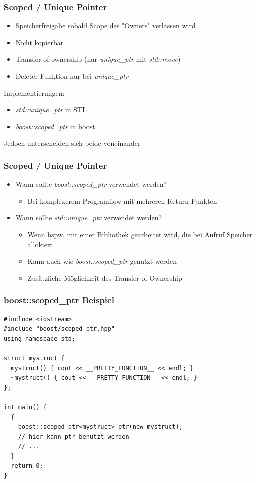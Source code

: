 \documentclass{beamer}
\begin{document}
\begin{frame}[fragile]
 \frametitle{Scoped / Unique Pointer}
 \begin{itemize}
  \item Speicherfreigabe sobald Scope des "Owners" verlassen wird
  \item Nicht kopierbar
  \item Transfer of ownership \tiny (nur \textit{unique\_ptr} mit \textit{std::move})
  \item \normalsize Deleter Funktion nur bei \textit{unique\_ptr}
 \end{itemize}
 Implementierungen:
 \begin{itemize}
 	\item \textit{std::unique\_ptr} in STL
 	\item \textit{boost::scoped\_ptr} in boost
 \end{itemize}
 Jedoch unterscheiden sich beide voneinander
\end{frame}

\begin{frame}
 \frametitle{Scoped / Unique Pointer}
 \begin{itemize}
  \item Wann sollte \textit{boost::scoped\_ptr} verwendet werden?
   \begin{itemize}
 	\item Bei komplexerem Programflow mit mehreren Return Punkten
   \end{itemize}
  \item Wann sollte \textit{std::unique\_ptr} verwendet werden?
  \begin{itemize}
   \item Wenn bspw. mit einer Bibliothek gearbeitet wird, die bei Aufruf Speicher allokiert
   \item Kann auch wie \textit{boost::scoped\_ptr} genutzt werden
   \item Zusätzliche Möglichkeit des Transfer of Ownership
  \end{itemize}
 \end{itemize}
\end{frame}

\begin{frame}[fragile]
 \frametitle{boost::scoped\_ptr Beispiel}
 \begin{lstlisting}
#include <iostream>
#include "boost/scoped_ptr.hpp"
using namespace std;

struct mystruct {
  mystruct() { cout << __PRETTY_FUNCTION__ << endl; }
  ~mystruct() { cout << __PRETTY_FUNCTION__ << endl; }
};

int main() {
  {
    boost::scoped_ptr<mystruct> ptr(new mystruct);
    // hier kann ptr benutzt werden
    // ...
  }
  return 0;
}
 \end{lstlisting}
\end{frame}
\end{document}
